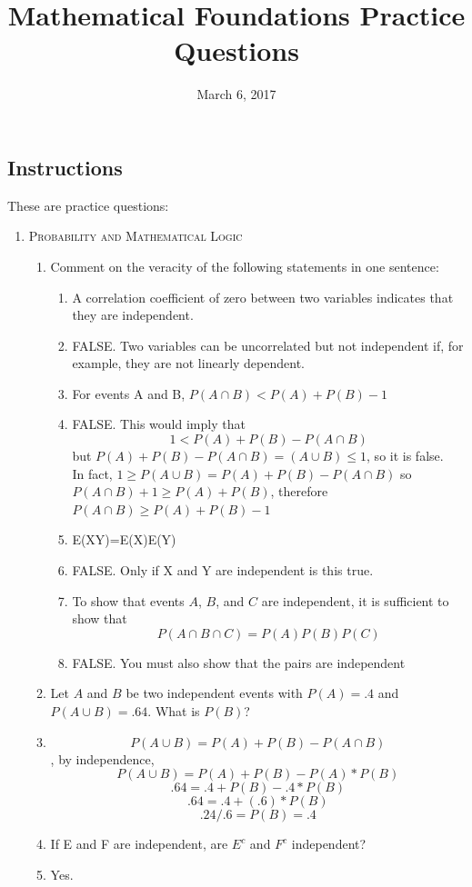 \documentclass[11pt,letterpaper]{article}
\title{Mathematical Foundations Practice Questions}
\date{March 6, 2017}
\numberwithin{equation}{section}
\begin{document}
\maketitle
\subsection*{Instructions}
These are practice questions:
\begin{enumerate}[I]
\item \textsc{Probability and Mathematical Logic }
\begin{enumerate}[1)]
\item Comment on the veracity of the following statements in one sentence:
\begin{enumerate}
\item A correlation coefficient of zero between two variables indicates that they are independent.
\item[A)] FALSE.  Two variables can be uncorrelated but not independent if, for example, they are not linearly dependent.
\item For events A and B, $P(A\cap B) < P(A)+P(B)-1$
\item[A)] FALSE.   This would imply that 
$$1< P(A)+P(B)-P(A\cap B) $$
but $P(A)+P(B)-P(A\cap B)=(A\cup B)\leq 1$, so it is false.\\

In fact, $1 \geq P(A\cup B) =P(A)+P(B) - P(A\cap B)$  so $P(A\cap B) + 1 \geq P(A)+P(B) $, therefore $P(A\cap B) \geq P(A)+P(B) - 1$
\item E(XY)=E(X)E(Y)
\item[A)] FALSE.  Only if X and Y are independent is this true.

\item To show that events $A$, $B$, and $C$ are independent, it is sufficient to show that $$P(A\cap B \cap C)=P(A)P(B)P(C)$$
\item[A)] FALSE.  You must also show that the pairs are independent

\end{enumerate}
\pagebreak
\item Let $A$ and $B$ be two independent events with $P(A)= .4$ and $P(A\cup B)=.64$.  What is $P(B)$?
\item[A)] 
$$P(A\cup B)=P(A)+P(B)-P(A\cap B)$$
, by independence, 
$$P(A\cup B)=P(A)+P(B)-P(A)*P(B)$$
$$.64=.4+P(B)-.4*P(B)$$
$$.64=.4+(.6)*P(B)$$
$$.24/.6=P(B)=.4$$


\item  If E and F are independent, are $E^c$ and $F^c$ independent?  
\item[A)] Yes.
\end{enumerate}




\end{enumerate}
\end{document}

